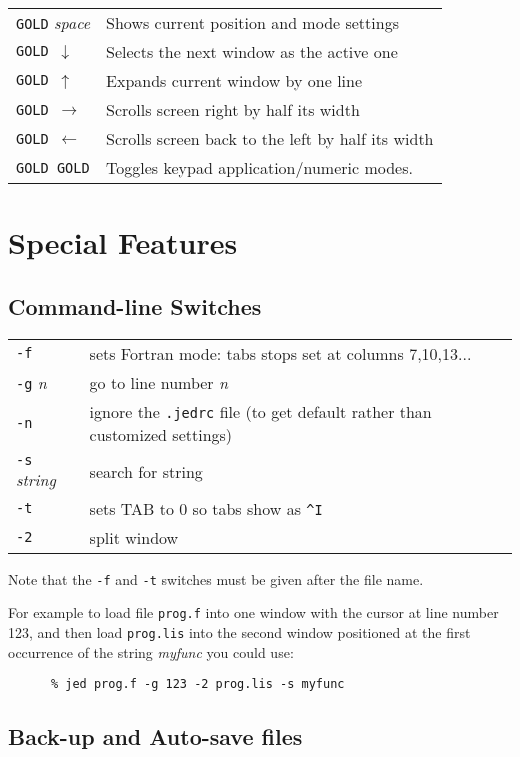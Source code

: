 \begin{center}
\begin{tabular}{|ll|}
{\tt GOLD} {\em space}   & Shows current position and mode settings \\
{\tt GOLD $\downarrow$}  & Selects the next window as the active one\\
{\tt GOLD $\uparrow$  }  & Expands current window by one line \\
{\tt GOLD $\rightarrow$} & Scrolls screen right by half its width \\
{\tt GOLD $\leftarrow$ } & Scrolls screen back to the left by half its width \\
{\tt GOLD GOLD}          & Toggles keypad application/numeric modes.\\
\hline
\end{tabular}
\end{center}

\section{Special Features}

\subsection{Command-line Switches}

\begin{tabular}{ll}
{\tt -f} & sets Fortran mode: tabs stops set at columns 7,10,13... \\
{\tt -g} {\em n} & go to line number {\em n} \\
{\tt -n} & ignore the {\tt .jedrc} file (to get default rather than 
customized settings) \\
{\tt -s} {\em string} & search for string \\
{\tt -t} & sets TAB to 0 so tabs show as {\verb+^I+}\\
{\tt -2} & split window \\
\end{tabular}

Note that the {\tt -f} and {\tt -t} switches must be given after the file
name.

For example to load file {\tt prog.f} into one window with the cursor at
line number 123, and then load {\tt prog.lis} into the second window
positioned at the first occurrence of the string {\em myfunc} you could
use:
\begin{verbatim}
      % jed prog.f -g 123 -2 prog.lis -s myfunc
\end{verbatim}

\subsection{Back-up and Auto-save files}

